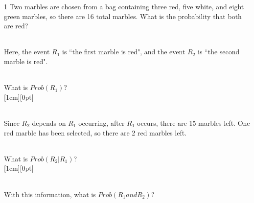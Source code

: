 \documentclass[a4paper,12pt]{book}
\newcounter{question}
\begin{document}
        \begin{question}{\thequestion}{1}
            Two marbles are chosen from a bag containing three red, five white, and eight green marbles,
            so there are 16 total marbles.
            What is the probability that both are red?

            ~\\
            Here, the event $R_{1}$ is ``the first marble is red",
            and the event $R_{2}$ is ``the second marble is red".

            ~\\
            What is $Prob(R_{1})$?
            { ~\\ \raisebox{0pt}[1cm][0pt]{  } }

            ~\\
            Since $R_{2}$ depends on $R_{1}$ occurring, after $R_{1}$
            occurs, there are 15 marbles left. One red marble
            has been selected, so there are 2 red marbles left.

            ~\\
            What is $Prob(R_{2} | R_{1})$?
            { ~\\ \raisebox{0pt}[1cm][0pt]{  } }

            ~\\
            With this information, what is $Prob(R_{1} and R_{2})$?
                
 
        \end{question}
\end{document}
